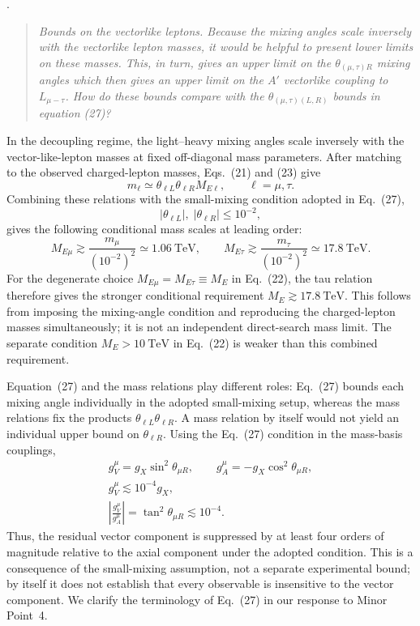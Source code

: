 \documentclass[12pt,a4paper]{article}
\begin{document}
\medskip
{}.
\begin{quote}\itshape
Bounds on the vectorlike leptons. Because the mixing angles scale inversely with the vectorlike lepton masses, it would be helpful to present lower limits on these masses. This, in turn, gives an upper limit on the \(\theta_{(\mu,\tau)R}\) mixing angles which then gives an upper limit on the \(A'\) vectorlike coupling to \(L_{\mu-\tau}\). How do these bounds compare with the \(\theta_{(\mu,\tau)(L,R)}\) bounds in equation (27)?
\end{quote}


In the decoupling regime, the light--heavy mixing angles scale inversely with the vector-like-lepton masses at fixed off-diagonal mass parameters. After matching to the observed charged-lepton masses, Eqs.~(21) and (23) give
\[
m_\ell\simeq\theta_{\ell L}\theta_{\ell R}M_{E\ell},
\qquad \ell=\mu,\tau.
\]
Combining these relations with the small-mixing condition adopted in Eq.~(27),
\[
|\theta_{\ell L}|,\;|\theta_{\ell R}|\leq10^{-2},
\]
gives the following conditional mass scales at leading order:
\[
M_{E\mu}\gtrsim\frac{m_\mu}{(10^{-2})^2}\simeq1.06~\mathrm{TeV},
\qquad
M_{E\tau}\gtrsim\frac{m_\tau}{(10^{-2})^2}\simeq17.8~\mathrm{TeV}.
\]
For the degenerate choice \(M_{E\mu}=M_{E\tau}\equiv M_E\) in Eq.~(22), the tau relation therefore gives the stronger conditional requirement \(M_E\gtrsim17.8~\mathrm{TeV}\). This follows from imposing the mixing-angle condition and reproducing the charged-lepton masses simultaneously; it is not an independent direct-search mass limit. The separate condition \(M_E>10~\mathrm{TeV}\) in Eq.~(22) is weaker than this combined requirement.

Equation~(27) and the mass relations play different roles: Eq.~(27) bounds each mixing angle individually in the adopted small-mixing setup, whereas the mass relations fix the products \(\theta_{\ell L}\theta_{\ell R}\). A mass relation by itself would not yield an individual upper bound on \(\theta_{\ell R}\). Using the Eq.~(27) condition in the mass-basis couplings,
\[
\begin{gathered}
g_V^\mu=g_X\sin^2\theta_{\mu R},\qquad
g_A^\mu=-g_X\cos^2\theta_{\mu R},\\
g_V^\mu\lesssim10^{-4}g_X,\\
\left|\frac{g_V^\mu}{g_A^\mu}\right|=\tan^2\theta_{\mu R}\lesssim10^{-4}.
\end{gathered}
\]
Thus, the residual vector component is suppressed by at least four orders of magnitude relative to the axial component under the adopted condition. This is a consequence of the small-mixing assumption, not a separate experimental bound; by itself it does not establish that every observable is insensitive to the vector component. We clarify the terminology of Eq.~(27) in our response to Minor Point~4.
\end{document}
